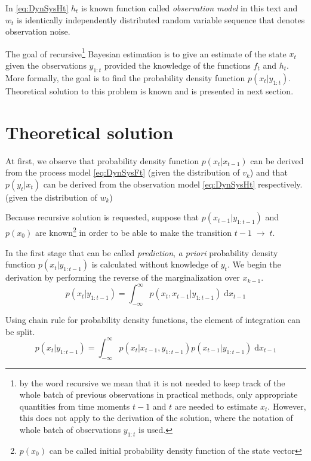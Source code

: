 \documentclass[a4paper,12pt,oneside]{report}
\newcommand{\pdf}{probability density function}
\newcommand{\pdfs}{probability density functions}
\newcommand{\dx}{\mathrm{d}x}
\begin{document}
In \eqref{eq:DynSysHt} \(h_t\) is known function called \emph{observation model} in this text and \(w_t\) is
identically independently distributed random variable sequence that denotes observation noise.

The goal of recursive\footnote{by the word recursive we mean that it is not needed to keep track of
the whole batch of previous observations in practical methods, only appropriate quantities from time
moments \(t-1\) and \(t\) are needed to estimate \(x_t\). However, this does not apply to the
derivation of the solution, where the notation of whole batch of observations \(y_{1:t}\) is used.}
Bayesian estimation is to give an estimate of the state \(x_t\) given the
observations \(y_{1:t}\) provided the knowledge of the functions \(f_t\) and \(h_t\).
More formally, the goal is to find the {\pdf} \(p(x_t | y_{1:t})\).
Theoretical solution to this problem is known and is presented in next section.

\section{Theoretical solution}

At first, we observe that {\pdf} \(p(x_t|x_{t-1})\) can be derived from the process model
\eqref{eq:DynSysFt} (given the distribution of \(v_k\)) and that \(p(y_t|x_t)\) can be derived from
the observation model \eqref{eq:DynSysHt} respectively. (given the distribution of \(w_k\))

Because recursive solution is requested, suppose that \(p(x_{t-1}|y_{1:t-1})\) and
\(p(x_0)\) are known\footnote{\(p(x_0)\) can be called initial {\pdf} of the state vector} in
order to be able to make the transition \(t-1 \; \rightarrow \; t\).

In the first stage that can be called \emph{prediction}, \emph{a priori} {\pdf}
\(p(x_t | y_{1:t-1})\) is calculated without knowledge of \(y_t\). We begin the derivation by
performing the reverse of the marginalization over \(x_{k-1}\).
\begin{equation*}
	p(x_t | y_{1:t-1}) = \int_{-\infty}^{\infty} p(x_t, x_{t-1} | y_{1:t-1}) \; \dx_{t-1}
\end{equation*}

Using chain rule for {\pdfs}, the element of integration can be split.
\begin{equation*}
	p(x_t | y_{1:t-1}) = \int_{-\infty}^{\infty} p(x_t | x_{t-1}, y_{1:t-1}) p(x_{t-1} | y_{1:t-1}) \; \dx_{t-1}
\end{equation*}
\end{document}
